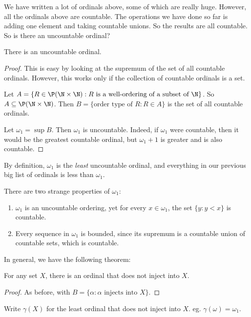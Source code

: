 \documentclass[a4paper]{article}
\begin{document}
We have written a lot of ordinals above, some of which are really huge. However, all the ordinals above are countable. The operations we have done so far is adding one element and taking countable unions. So the results are all countable. So is there an uncountable ordinal?

\begin{thm}
  There is an uncountable ordinal.
\end{thm}

\begin{proof}
  This is easy by looking at the supremum of the set of all countable ordinals. However, this works only if the collection of countable ordinals is a set.

  Let $A = \{R\in \P(\N\times \N): R \text{ is a well-ordering of a subset of }\N\}$. So $A \subseteq \P(\N\times \N)$. Then $B = \{\text{order type of }R: R\in A\}$ is the set of all countable ordinals.

  Let $\omega_1 = \sup B$. Then $\omega_1$ is uncountable. Indeed, if $\omega_1$ were countable, then it would be the greatest countable ordinal, but $\omega_1 + 1$ is greater and is also countable.
\end{proof}

By definition, $\omega_1$ is the \emph{least} uncountable ordinal, and everything in our previous big list of ordinals is less than $\omega_1$.

There are two strange properties of $\omega_1$:
\begin{enumerate}
  \item $\omega_1$ is an uncountable ordering, yet for every $x\in \omega_1$, the set $\{y: y< x\}$ is countable.
  \item Every sequence in $\omega_1$ is bounded, since its supremum is a countable union of countable sets, which is countable.
\end{enumerate}

In general, we have the following theorem:
\begin{thm}
  For any set $X$, there is an ordinal that does not inject into $X$.
\end{thm}

\begin{proof}
  As before, with $B = \{\alpha: \alpha\text{ injects into }X\}$.
\end{proof}

\begin{notation}
  Write $\gamma(X)$ for the least ordinal that does not inject into $X$. eg. $\gamma(\omega) = \omega_1$.
\end{notation}
\end{document}
